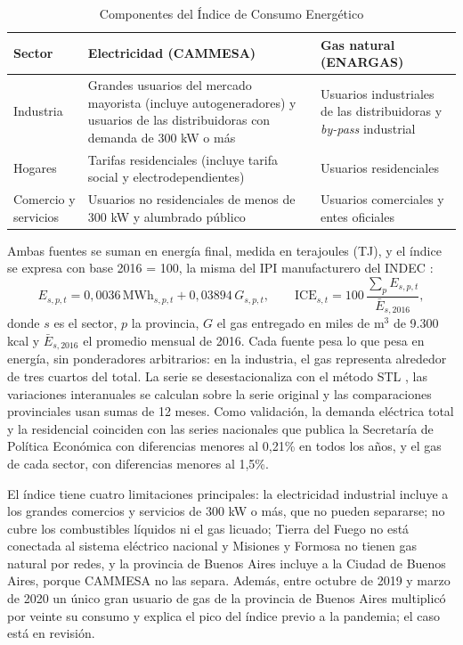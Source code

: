 \begin{table}[!htb]
\centering
\small
\caption{Componentes del Índice de Consumo Energético}
\vspace{.25 cm}
\label{tab:ice_componentes}
\begin{tabular}{@{}p{2.6cm}p{6.2cm}p{6.2cm}@{}}
\toprule
Sector & Electricidad (CAMMESA) & Gas natural (ENARGAS) \\
\midrule
Industria & Grandes usuarios del mercado mayorista (incluye autogeneradores) y usuarios de las distribuidoras con demanda de 300 kW o más & Usuarios industriales de las distribuidoras y \emph{by-pass} industrial \\
Hogares & Tarifas residenciales (incluye tarifa social y electrodependientes) & Usuarios residenciales \\
Comercio y servicios & Usuarios no residenciales de menos de 300 kW y alumbrado público & Usuarios comerciales y entes oficiales \\
\bottomrule
\end{tabular}
\end{table}

Ambas fuentes se suman en energía final, medida en terajoules (TJ), y el índice se expresa con base 2016 = 100, la misma del IPI manufacturero del INDEC \cite{indec_ipi}:
\begin{equation*}
E_{s,p,t} = 0{,}0036\,\text{MWh}_{s,p,t} + 0{,}03894\,G_{s,p,t}, \qquad
\text{ICE}_{s,t} = 100\,\frac{\sum_{p} E_{s,p,t}}{\bar{E}_{s,2016}},
\end{equation*}
donde $s$ es el sector, $p$ la provincia, $G$ el gas entregado en miles de m$^3$ de 9.300 kcal y $\bar{E}_{s,2016}$ el promedio mensual de 2016. Cada fuente pesa lo que pesa en energía, sin ponderadores arbitrarios: en la industria, el gas representa alrededor de tres cuartos del total. La serie se desestacionaliza con el método STL \cite{stl}, las variaciones interanuales se calculan sobre la serie original y las comparaciones provinciales usan sumas de 12 meses. Como validación, la demanda eléctrica total y la residencial coinciden con las series nacionales que publica la Secretaría de Política Económica \cite{sspm} con diferencias menores al 0,21\% en todos los años, y el gas de cada sector, con diferencias menores al 1,5\%.

El índice tiene cuatro limitaciones principales: la electricidad industrial incluye a los grandes comercios y servicios de 300 kW o más, que no pueden separarse; no cubre los combustibles líquidos ni el gas licuado; Tierra del Fuego no está conectada al sistema eléctrico nacional y Misiones y Formosa no tienen gas natural por redes, y la provincia de Buenos Aires incluye a la Ciudad de Buenos Aires, porque CAMMESA no las separa. Además, entre octubre de 2019 y marzo de 2020 un único gran usuario de gas de la provincia de Buenos Aires multiplicó por veinte su consumo y explica el pico del índice previo a la pandemia; el caso está en revisión.

